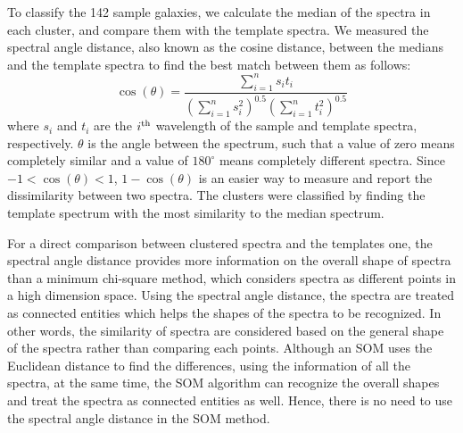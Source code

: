     To classify the 142 sample galaxies, we calculate the median of the spectra in each cluster, and compare them with the  template spectra.
    We measured the spectral angle distance, also known as the cosine distance, between the medians and the template spectra to find the best match between them as follows:
    \begin{equation}
        \cos(\theta) = \frac{\sum_{i=1}^{n} s_it_i}{(\sum_{i=1}^{n} s^2_i)^{0.5} (\sum_{i=1}^{n} t^2_i)^{0.5}}
    \end{equation}
    where $s_i$ and $t_i$ are the $i^{\rm th}$ wavelength of the sample and template spectra, respectively. 
    $\theta$ is the angle between the spectrum, such that a value of zero means completely similar and a value of $180^{\circ}$ means completely different spectra. 
    Since $-1<\cos(\theta)<1$, $1-\cos(\theta)$ is an easier way to measure and report the dissimilarity between two spectra.
    The clusters were classified by finding the  template spectrum with the most similarity to the median spectrum.
   
    For a direct comparison between clustered spectra and the templates one, the spectral angle distance provides more information on the overall shape of spectra than a minimum chi-square method, which considers spectra as different points in a high dimension space. 
    Using the spectral angle distance, the spectra are treated as connected entities which helps the shapes of the spectra to be recognized. 
    In other words, the similarity of spectra are considered based on the general shape of the spectra rather than comparing each points.
    Although an SOM uses the Euclidean distance to find the differences, using the information of all the spectra, at the same time, the SOM algorithm can recognize the overall shapes and treat the spectra as connected entities as well. 
    Hence, there is no need to use the spectral angle distance in the SOM method.
    

